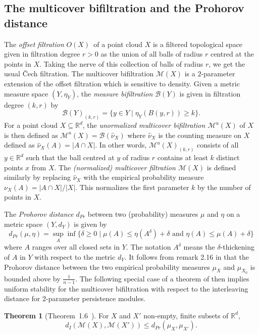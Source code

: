 \documentclass[10pt,a4paper]{article}
\theoremstyle{definition}
\newtheorem{thm}{Theorem}[section]
\newcommand{\R}{\mathbb{R}}
\begin{document}
\subsection{The multicover bifiltration and the Prohorov distance}
The \textit{offset filtration} $O(X)$ of a point cloud $X$ is a filtered topological space given in filtration degree $r>0$ as the union of all balls of radius $r$ centred at the points in $X$. Taking the nerve of this collection of balls of radius $r$, we get the usual Čech filtration. The multicover bifiltration $\mathcal{M}(X)$ is a $2$-parameter extension of the offset filtration which is sensitive to density. Given a metric measure space $(Y,\eta_Y)$, the \textit{measure bifiltration $\mathcal{B}(Y)$} is given in filtration degree $(k,r)$ by $$\mathcal{B}(Y)_{(k,r)}=\{y\in Y\mid\eta_Y(B(y,r))\geq k\}.$$
For a point cloud $X\subseteq\R^d$, the \textit{unormalized multicover bifiltration $\mathcal{M}^u(X)$} of $X$ is then defined as $\mathcal{M}^u(X)=\mathcal{B}(\hat{\nu}_X)$ where $\hat{\nu}_X$ is the counting measure on $X$ defined as $\hat{\nu}_X(A)=|A\cap X|$. In other words, $\mathcal{M}^u(X)_{(k,r)}$ consists of all $y\in \R^d$ such that the ball centred at $y$ of radius $r$ contains at least $k$ distinct points $x$ from $X$. The \textit{(normalized) multicover filtration $\mathcal{M}(X)$} is defined similarly by replacing $\hat{\nu}_X$ with the empirical probability measure $\nu_X(A)=|A\cap X|/|X|$. This normalizes the first parameter $k$ by the number of points in $X$.


The \textit{Prohorov distance} $d_{Pr}$ between two (probability) measures $\mu$ and $\eta$ on a metric space $(Y,d_Y)$ is given by
$$
d_{Pr}(\mu, \eta) = \sup_A\inf\{\delta\geq0\mid\mu(A)\leq\eta(A^\delta)+\delta\text{ and } \eta(A)\leq\mu(A)+\delta\}
$$
where $A$ ranges over all closed sets in $Y$. The notation $A^\delta$ means the $\delta$-thickening of $A$ in $Y$ with respect to the metric $d_Y$. It follows from remark 2.16 in \cite{Blumberg2020} that the Prohorov distance between the two empirical probability measures $\mu_X$ and $\mu_{X_0}$ is bounded above by $\frac{1}{n-1}$. The following special case of a theorem of \cite{Blumberg2020} then implies uniform stability for the multicover bifiltration with respect to the interleaving distance for 2-parameter persistence modules.

\begin{thm}[Theorem~1.6~\cite{Blumberg2020}]
For $X$ and $X'$ non-empty, finite subsets of $\mathbb{R}^d$,
$$
d_I(\mathcal{M}(X), \mathcal{M}(X'))\leq d_{Pr}(\mu_X, \mu_{X'}).
$$
\end{thm}
\end{document}

